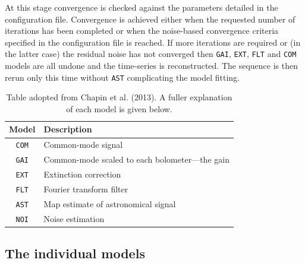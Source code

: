 \documentclass[twoside,11pt]{article}
\newcommand{\xlabel}[1]{}
\renewcommand{\_}{\texttt{\symbol{95}}}
\begin{document}
At this stage convergence is checked against the parameters detailed
in the configuration file. Convergence is achieved either when the
requested number of iterations has been completed or when the
noise-based convergence criteria specified in the configuration file
is reached. If more iterations are required or (in the latter case)
the residual noise has not converged then \texttt{GAI}, \texttt{EXT},
\texttt{FLT} and \texttt{COM} models are all undone and the
time-series is reconstructed. The sequence is then rerun only this
time without \texttt{AST} complicating the model fitting.

\begin{htmlonly}
\setlength{\extrarowheight}{3pt}
\begin{table}
\centering
\begin{tabular}{c|l}
\hline
\textbf{Model} &\hspace{0.2cm} \textbf{Description} \\
\hline
\texttt{COM}&\hspace{0.2cm} Common-mode signal\\
\texttt{GAI}&\hspace{0.2cm} Common-mode scaled to each bolometer---the gain\\
\texttt{EXT}&\hspace{0.2cm} Extinction correction\\
\texttt{FLT}&\hspace{0.2cm} Fourier transform filter\\
\texttt{AST}&\hspace{0.2cm} Map estimate of astronomical signal\\
\texttt{NOI}&\hspace{0.2cm} Noise estimation\\
\hline
\end{tabular}
\label{tab:mods}
\caption{\small Table adopted from Chapin et al. (2013). A fuller
explanation of each model is given below.}
\end{table}
\end{htmlonly}

\raggedbottom
\subsection{\xlabel{models}The individual models}
\label{sec:models}
\end{document}
